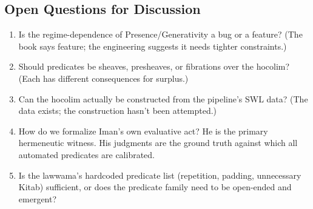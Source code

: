 \documentclass[11pt,a4paper]{article}
\begin{document}
\subsection{Open Questions for Discussion}

\begin{enumerate}[nosep]
  \item Is the regime-dependence of Presence/Generativity a bug or a feature?
    (The book says feature; the engineering suggests it needs tighter constraints.)
  \item Should predicates be sheaves, presheaves, or fibrations over the hocolim?
    (Each has different consequences for surplus.)
  \item Can the hocolim actually be constructed from the pipeline's SWL data?
    (The data exists; the construction hasn't been attempted.)
  \item How do we formalize Iman's own evaluative act? He is the primary
    hermeneutic witness. His judgments are the ground truth against which
    all automated predicates are calibrated.
  \item Is the lawwama's hardcoded predicate list (repetition, padding, unnecessary
    Kitab) sufficient, or does the predicate family need to be open-ended and
    emergent?
\end{enumerate}
\end{document}
